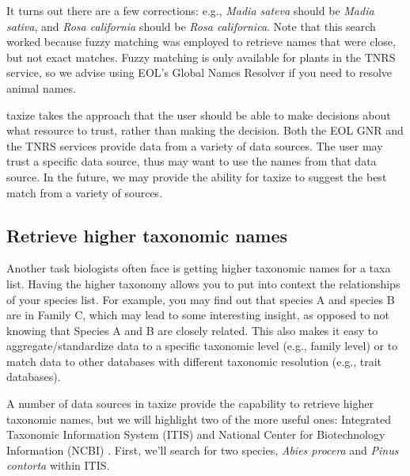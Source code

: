 \documentclass[10pt]{article}\usepackage[]{graphicx}\usepackage[]{color}
\begin{document}
It turns out there are a few corrections: e.g., \emph{Madia sateva} should be \emph{Madia sativa}, and \emph{Rosa california} should be \emph{Rosa californica}. Note that this search worked because fuzzy matching was employed to retrieve names that were close, but not exact matches. Fuzzy matching is only available for plants in the TNRS service, so we advise using EOL's Global Names Resolver if you need to resolve animal names.

taxize takes the approach that the user should be able to make decisions about what resource to trust, rather than making the decision. Both the EOL GNR and the TNRS services provide data from a variety of data sources. The user may trust a specific data source, thus may want to use the names from that data source. In the future, we may provide the ability for taxize to suggest the best match from a variety of sources.

\subsection*{Retrieve higher taxonomic names}
Another task biologists often face is getting higher taxonomic names for a taxa list. Having the higher taxonomy allows you to put into context the relationships of your species list. For example, you may find out that species A and species B are in Family C, which may lead to some interesting insight, as opposed to not knowing that Species A and B are closely related. This also makes it easy to aggregate/standardize data to a specific taxonomic level (e.g., family level) or to match data to other databases with different taxonomic resolution (e.g., trait databases).

A number of data sources in taxize provide the capability to retrieve higher taxonomic names, but we will highlight two of the more useful ones: Integrated Taxonomic Information System (ITIS) \cite{itis} and National Center for Biotechnology Information (NCBI) \cite{federhen}. First, we'll search for two species, \emph{Abies procera} and \emph{Pinus contorta} within ITIS.
\end{document}
